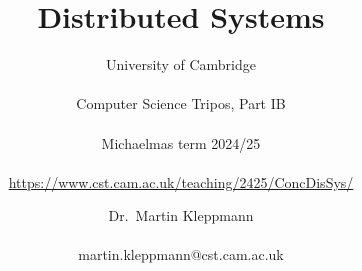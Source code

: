 
\newcommand{\coursepath}{/teaching/2425/ConcDisSys/}
\newcommand{\courseurl}{\url{https://www.cst.cam.ac.uk\coursepath}}
\newcommand{\thisyear}{2024/25}
\newcommand{\timestampexample}{2021-11-09T09:50:17+00:00}
\newcommand{\whenissecurity}{Part IB Easter term}
\newcommand{\whenisnetworking}{Part IB Lent term}
\newcommand{\networking}{https://www.cl.cam.ac.uk/teaching/2425/CompNet/}
\newcommand{\security}{https://www.cl.cam.ac.uk/teaching/2425/CySecurity/}
\newcommand{\ledgersystems}{https://www.cl.cam.ac.uk/teaching/2425/R47/}
\newcommand{\multicore}{https://www.cl.cam.ac.uk/teaching/2425/L304/}

\newcommand{\mydetails}{%
    Dr.\ Martin Kleppmann \\\\
    martin.kleppmann@cst.cam.ac.uk\\\\[1em]
    University of Cambridge\\\\
    Computer Science Tripos, Part IB%
}



\title{Distributed Systems}
\subtitle{University of Cambridge\\\\%
Computer Science Tripos, Part IB\\\\%
Michaelmas term \thisyear\\\\%
\courseurl}

\author{Dr.\ Martin Kleppmann\\\\martin.kleppmann@cst.cam.ac.uk}
\date{}
\maketitle
\tableofcontents

